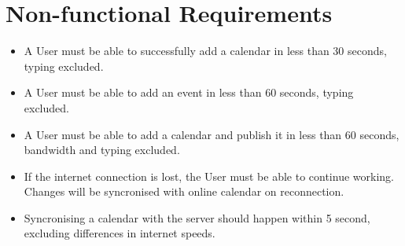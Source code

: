 \documentclass[10pt]{report}
\numberwithin{equation}{section} %
\numberwithin{figure}{section} %
\numberwithin{table}{section} %
\begin{document}
\section{Non-functional Requirements}
\begin{itemize}
\item A User must be able to successfully add a calendar in less than 30
  seconds, typing excluded.
\item A User must be able to add an event in less than 60 seconds, typing
  excluded.
\item A User must be able to add a calendar and publish it in less than 60
  seconds, bandwidth and typing excluded.
\item If the internet connection is lost, the User must be able to continue working. Changes will be syncronised with online calendar on reconnection.
\item Syncronising a calendar with the server should happen within 5 second, excluding differences in internet speeds.
\end{itemize}
\end{document}

